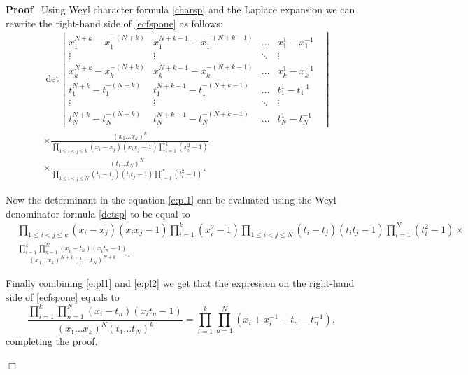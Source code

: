 \documentclass[11pt]{amsart}
\renewenvironment{proof}{
\noindent\textbf{Proof}\ }{\hspace*{\fill}
\begin{math}\Box\end{math}\medskip}
\begin{document}
\begin{proof}
Using Weyl character formula \eqref{charsp} and the Laplace
expansion we can rewrite the right-hand side of \eqref{ecfspone}
as follows:
\begin{equation} \label{e:pl1}
\begin{aligned}
&\det \left|
  \begin{array}{ccccc}
  x_1^{N+k}-x_1^{-(N+k)} &   x_1^{N+k-1}-x_1^{-(N+k-1)}&
\dots &  x_1^{1}-x_1^{-1}& \\
    \vdots & \vdots &\ddots & \vdots & \\
x_k^{N+k}-x_k^{-(N+k)} &   x_k^{N+k-1}-x_k^{-(N+k-1)}&
\dots &  x_k^{1}-x_k^{-1}& \\
t_1^{N+k}-t_1^{-(N+k)} &   t_1^{N+k-1}-t_1^{-(N+k-1)}&
\dots &  t_1^{1}-t_1^{-1}& \\
    \vdots & \vdots &\ddots & \vdots & \\
t_N^{N+k}-t_{N}^{-(N+k)} &   t_N^{N+k-1}-t_N^{-(N+k-1)}& \dots &
t_N^{1}-t_N^{-1}
\end{array} \right| \\
&\times  \frac {(x_1 \dots x_k)^{k}}{\prod_{1 \leqslant i<j \le
k}(x_i-x_j)(x_i x_j-1) \prod_{i=1}^{k}(x_i^2-1)} \\
&\times  \frac {(t_1 \dots t_N)^{N}}{\prod_{1 \leqslant i<j \le
N}(t_i-t_j)(t_i t_j-1) \prod_{i=1}^{N}(t_i^2-1)}.
\end{aligned}
\end{equation}

Now the determinant in the equation \eqref{e:pl1} can be evaluated
using the Weyl denominator formula \eqref{detsp} to be equal to
\begin{equation} \label{e:pl2}
\begin{aligned}&\prod_{1 \leqslant i<j \leqslant k}(x_i-x_j)(x_i x_j-1)
\prod_{i=1}^{k}(x_i^2-1) \prod_{1 \leqslant i<j \leqslant
N}(t_i-t_j)(t_i
t_j-1) \prod_{i=1}^{N}(t_i^2-1) \times\\
&\frac{ \prod_{i = 1}^k \prod_{n = 1}^N (x_i-t_n)(x_i t_n-1)}{(x_1
\dots x_k)^{N+k}  (t_1 \dots t_N)^{N+k}}.
\end{aligned}
\end{equation}

Finally combining \eqref{e:pl1} and \eqref{e:pl2} we get that the
expression on the right-hand side of \eqref{ecfspone} equals to
\begin{equation*}
\frac{ \prod_{i = 1}^k \prod_{n = 1}^N (x_i-t_n)(x_i t_n-1)}{(x_1
\dots x_k)^{N}  (t_1 \dots t_N)^{k}} =\prod_{i = 1}^k \prod_{n =
1}^N ( x_i + x_i^{- 1} - t_n - t_n^{- 1} ),
\end{equation*}
completing the proof.

\end{proof}
\end{document}
